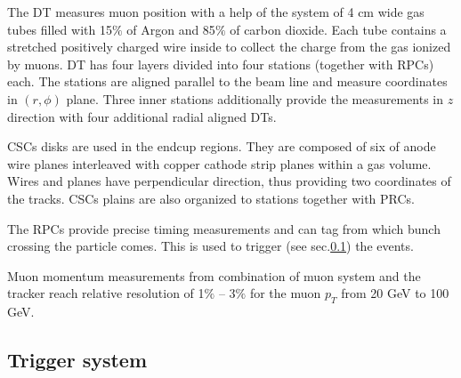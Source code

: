 The DT measures muon position with a help of the system of 4 cm wide gas tubes filled with 15$\%$ of Argon and 85$\%$ of carbon dioxide.
Each tube contains a stretched positively charged wire inside to collect the charge from the gas ionized by muons. DT has four layers
divided into four stations (together with RPCs) each. The stations are aligned parallel to the beam line and measure coordinates in $(r,\phi)$
plane. Three inner stations additionally provide the measurements in $z$ direction with four additional radial aligned DTs.

CSCs disks are used in the endcup regions. They are composed of six of anode wire planes interleaved with copper cathode strip planes within 
a gas volume. Wires and planes have perpendicular direction, thus providing two coordinates of the tracks. CSCs plains are also organized 
to stations together with PRCs.

The RPCs provide precise timing measurements and can tag from which bunch crossing the particle comes. This is used to trigger (see sec.\ref{sec:trig})
the events.

Muon momentum measurements from combination of muon system and the tracker reach relative resolution of 1$\%$ -- 3$\%$ for the muon $p_{T}$ from
20 GeV to 100 GeV.

\subsection{Trigger system}\label{sec:trig}
% 
